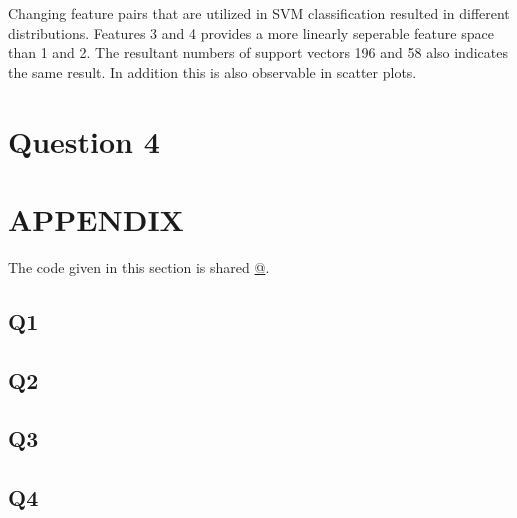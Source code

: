 \documentclass[11pt]{extarticle}
\begin{document}
Changing feature pairs that are utilized in SVM classification resulted in different distributions. Features 3 and 4
provides a more linearly seperable feature space than 1 and 2. The resultant numbers of support vectors 196 and 58 also
indicates the same result. In addition this is also observable in scatter plots.

\section{Question 4}




\pagebreak
\section{APPENDIX}
The code given in this section is shared \href{https://github.com/kutay-ugurlu/Pattern-Recognition/tree/master/HW3}{@\faGithubSquare}.
\subsection{Q1}\label{subsec:Q1_code}

\pagebreak
\subsection{Q2} \label{subsec:Q2_code}

\pagebreak
\subsection{Q3}\label{subsec:Q3_code}

\pagebreak
\subsection{Q4}\label{subsec:Q4_code}

\end{document}
